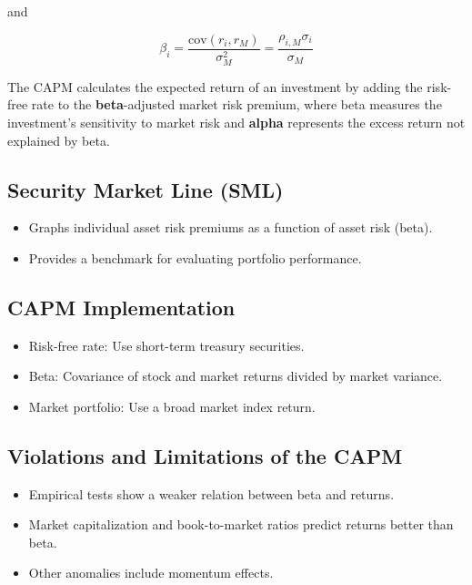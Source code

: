 \documentclass[
]{book}
\providecommand{\tightlist}{%
  \setlength{\itemsep}{0pt}\setlength{\parskip}{0pt}}
\begin{document}
and

\[
\beta_i = \frac{\text{cov}(r_i, r_M)}{\sigma_M^2} = \frac{\rho_{i,M} \sigma_i}{\sigma_M}
\]

The CAPM calculates the expected return of an investment by adding the
risk-free rate to the \textbf{beta}-adjusted market risk premium, where
beta measures the investment's sensitivity to market risk and
\textbf{alpha} represents the excess return not explained by beta.

\hypertarget{security-market-line-sml}{%
\subsection{Security Market Line (SML)}\label{security-market-line-sml}}

\begin{itemize}
\tightlist
\item
  Graphs individual asset risk premiums as a function of asset risk
  (beta).
\item
  Provides a benchmark for evaluating portfolio performance.
\end{itemize}

\hypertarget{capm-implementation}{%
\subsection{CAPM Implementation}\label{capm-implementation}}

\begin{itemize}
\tightlist
\item
  Risk-free rate: Use short-term treasury securities.
\item
  Beta: Covariance of stock and market returns divided by market
  variance.
\item
  Market portfolio: Use a broad market index return.
\end{itemize}

\hypertarget{violations-and-limitations-of-the-capm}{%
\subsection{Violations and Limitations of the
CAPM}\label{violations-and-limitations-of-the-capm}}

\begin{itemize}
\tightlist
\item
  Empirical tests show a weaker relation between beta and returns.
\item
  Market capitalization and book-to-market ratios predict returns better
  than beta.
\item
  Other anomalies include momentum effects.
\end{itemize}
\end{document}
